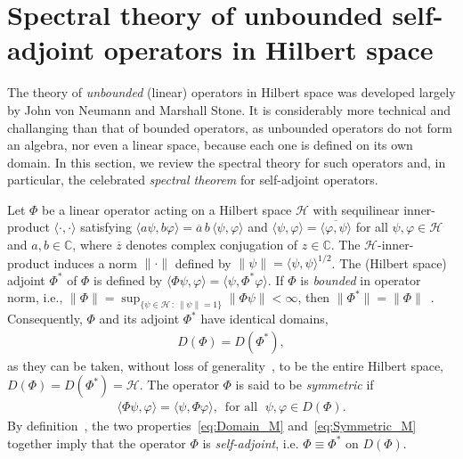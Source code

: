 \documentclass[leqno,onefignum,onetabnum]{siamltex1213}
\newcommand{\Hs}{\mathscr{H}}
\begin{document}
\section{Spectral theory of unbounded self-adjoint operators in
  Hilbert space} \label{sec:Spectral_Theory}    
%
The theory of \emph{unbounded} (linear) operators in Hilbert
space was developed largely by John von Neumann and Marshall Stone. It
is considerably more technical and challanging than that of bounded
operators, as unbounded operators do not form an algebra, nor even a
linear space, because each one is defined on its own domain. In this
section, we review the spectral theory for such operators and, in
particular, the celebrated \emph{spectral theorem} for self-adjoint
operators.



Let $\Phi$ be a linear operator acting on a Hilbert space $\Hs$ with
sequilinear inner-product $\langle\cdot,\cdot\rangle$ satisfying
$\langle a\psi,b\varphi\rangle=\overline{a}\,b\,\langle\psi,\varphi\rangle$ and $\langle\psi,\varphi\rangle=\overline{\langle\varphi,\psi\rangle}$ for all
$\psi,\varphi\in\Hs$ and $a,b\in\mathbb{C}$, where $\overline{z}$ denotes complex
conjugation of $z\in\mathbb{C}$. The $\Hs$-inner-product induces a norm $\|\cdot\|$
defined by $\|\psi\|=\langle\psi,\psi\rangle^{1/2}$. The (Hilbert space) adjoint $\Phi^*$ of $\Phi$
is defined by $\langle\Phi\psi,\varphi\rangle=\langle\psi,\Phi^*\varphi\rangle$. If $\Phi$ is \emph{bounded}
in operator norm,
i.e., $\|\Phi\|=\sup_{\{\psi\in\Hs \,:\, \|\psi\|=1\}}\|\Phi\psi\|<\infty$, then
$\|\Phi^*\|=\|\Phi\|$~\cite{Reed-1980}. Consequently, $\Phi$ and its adjoint $\Phi^*$
have identical domains,          
%
\begin{align}\label{eq:Domain_M}
  D(\Phi)=D(\Phi^*),
\end{align}
%
as they can be taken, without loss of
generality~\cite{Stakgold:BVP:2000}, to be the entire Hilbert space,
$D(\Phi)=D(\Phi^*)=\Hs$. The operator $\Phi$ is said to be \emph{symmetric} if    
% 
\begin{align}\label{eq:Symmetric_M}
  \langle\Phi\psi,\varphi\rangle=\langle\psi,\Phi\varphi\rangle,
  \, \text{ for all } \; \psi,\varphi\in D(\Phi).
\end{align}
%
By definition~\cite{Reed-1980,Stone:64}, the two
properties~\eqref{eq:Domain_M} and~\eqref{eq:Symmetric_M} together
imply that the operator $\Phi$ is \emph{self-adjoint}, i.e. $\Phi\equiv\Phi^*$
on $D(\Phi)$. 
\end{document}
